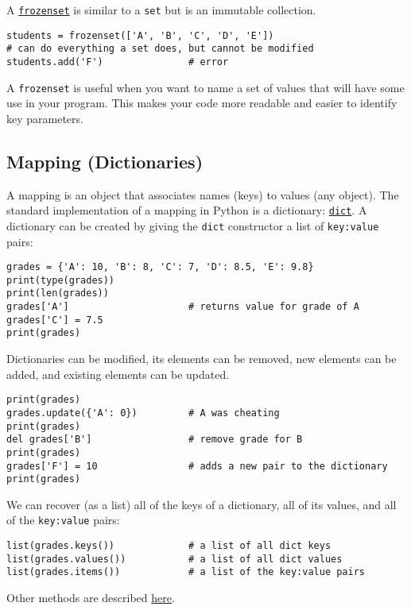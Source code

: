 \documentclass[12pt, a4paper]{article}
\begin{document}
A \href{https://docs.python.org/3.6/library/stdtypes.html\#frozenset}{\texttt{frozenset}} is similar to a \texttt{set} but is an immutable collection.
\lstset{language=jupyter-python,label= ,caption= ,captionpos=b,numbers=none}
\begin{lstlisting}
students = frozenset(['A', 'B', 'C', 'D', 'E'])
# can do everything a set does, but cannot be modified
students.add('F')               # error
\end{lstlisting}
A \texttt{frozenset} is useful when you want to name a set of values that will have some use in your program.
This makes your code more readable and easier to identify key parameters.
\subsection{Mapping (Dictionaries)}
\label{sec:orgb5b9298}
A mapping is an object that associates names (keys) to values (any object).
The standard implementation of a mapping in Python is a dictionary: \href{https://docs.python.org/3.6/library/stdtypes.html\#dict}{\texttt{dict}}.
A dictionary can be created by giving the \texttt{dict} constructor a list of \texttt{key:value} pairs:
\lstset{language=jupyter-python,label= ,caption= ,captionpos=b,numbers=none}
\begin{lstlisting}
grades = {'A': 10, 'B': 8, 'C': 7, 'D': 8.5, 'E': 9.8}
print(type(grades))
print(len(grades))
grades['A']                     # returns value for grade of A
grades['C'] = 7.5
print(grades)
\end{lstlisting}

Dictionaries can be modified, its elements can be removed, new elements can be added, and existing elements can be updated.
\lstset{language=jupyter-python,label= ,caption= ,captionpos=b,numbers=none}
\begin{lstlisting}
print(grades)
grades.update({'A': 0})         # A was cheating
print(grades)
del grades['B']                 # remove grade for B
print(grades)
grades['F'] = 10                # adds a new pair to the dictionary
print(grades)
\end{lstlisting}

We can recover (as a list) all of the keys of a dictionary, all of its values, and all of the \texttt{key:value} pairs:
\lstset{language=jupyter-python,label= ,caption= ,captionpos=b,numbers=none}
\begin{lstlisting}
list(grades.keys())             # a list of all dict keys
list(grades.values())           # a list of all dict values
list(grades.items())            # a list of the key:value pairs
\end{lstlisting}
Other methods are described \href{https://docs.python.org/3.6/library/stdtypes.html\#dict}{here}.
\end{document}

